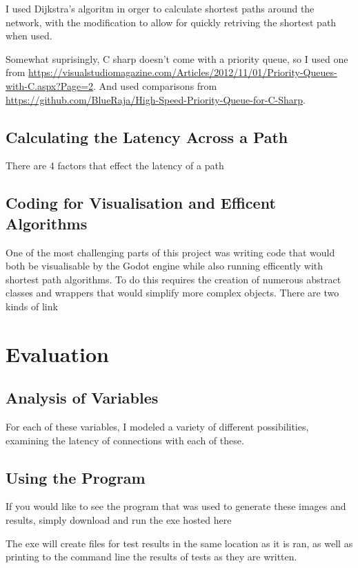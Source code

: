 \documentclass[12pt]{article}
\begin{document}
I used Dijkstra's algoritm in orger to calculate shortest paths around the network, with the modification to allow for quickly retriving the shortest path when used.

Somewhat suprisingly, C sharp doesn't come with a priority queue, so I used one from \url{https://visualstudiomagazine.com/Articles/2012/11/01/Priority-Queues-with-C.aspx?Page=2}. And used comparisons from \url{https://github.com/BlueRaja/High-Speed-Priority-Queue-for-C-Sharp}.

\subsection{Calculating the Latency Across a Path}

There are 4 factors that effect the latency of a path

\subsection{Coding for Visualisation and Efficent Algorithms}

One of the most challenging parts of this project was writing code that would both be visualisable by the Godot engine while also running efficently with shortest path algorithms. To do this requires the creation of numerous abstract classes and wrappers that would simplify more complex objects. There are two kinds of link

\section{Evaluation}

\subsection{Analysis of Variables}
For each of these variables, I modeled a variety of different possibilities, examining the latency of connections with each of these.


\subsection{Using the Program}

If you would like to see the program that was used to generate these images and results, simply download and run the exe hosted here %

The exe will create files for test results in the same location as it is ran, as well as printing to the command line the results of tests as they are written.
\end{document}
